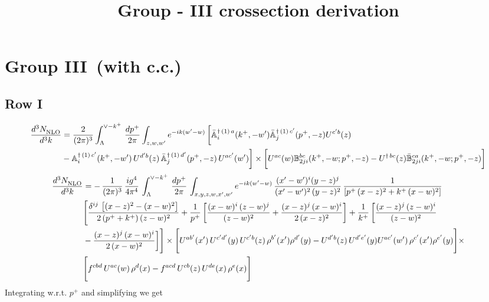 \documentclass[9pt]{article}
\title{Group - III crossection derivation}
\author{}
\date{}
\def\mf#1{\mathbb{#1}}
\numberwithin{equation}{section}
\begin{document}
\maketitle
\section{Group III\, (with c.c.)}
\subsection{Row I\, }
\begin{align}
 \frac{d^{3}N_{\rm NLO}^{\rm}}{d^{3}k}  & =    \frac{2}{(2\pi)^{3}} \int_{\Lambda}^{\vee - k^{+}}\, \frac{dp^{+}}{2\pi}\int_{z,w,w^{\prime}} e^{-ik(w^{\prime}-w)}\, 
        \bigg[\Bar{\mf{A}}^{\dagger\, (1)\, a}_{i}(k^{+},-w^{\prime})\Bar{\mf{A}}^{\dagger\, (1)\, c^{\prime}}_{j}(p^{+},-z)U^{c^{\prime}b}(z)\notag \\ & -\mf{A}^{\dagger\, (1)\, c^{\prime}}_{i}(k^{+},- w^{\prime})\,U^{d^{\prime}b}(z)\,\Bar{\mf{A}}^{\dagger\, (1)\, d^{\prime}}_{j}(p^{+},-z)\,U^{ac^{\prime}}(w^{\prime})  \bigg]\times \bigg[U^{ac}(w) \mf{B}^{bc}_{2ji}(k^{+},-w;p^{+},-z) -U^{\dagger\, bc}(z)\Bar{\mf{B}}^{ca}_{2ji}(k^{+},-w; p^{+},-z)\bigg] \nonumber
\end{align}
\begin{align}
    \frac{d^{3}N_{\rm NLO}^{\rm}}{d^{3}k}  & =  -\,\frac{1}{(2\pi)^{3}}\,\frac{ig^{4}}{4\pi^{4}}\, \int_{\Lambda}^{\vee-k^{+}}\, \frac{dp^{+}}{2\pi}\, \int_{x,y,z,w,x',w^{\prime}} e^{-ik(w^{\prime}-w)}\, \frac{(x'-w')^{i}(y-z)^{j}}{(x'-w')^{2}\,(y-z)^{2}}\, \frac{1}{\left[p^{+}\,(x-z)^{2}+k^{+}\,(x-w)^{2}\right]}\notag \\ & \Bigg[\frac{\delta^{ij}\, \left[(x-z)^{2}-(x-w)^{2}\right]}{2\, (p^{+}+k^{+})\,(z-w)^{2}}+\frac{1}{p^{+}}\, \bigg[\frac{(x-w)^{i}\,(z-w)^{j}}{(z-w)^{2}}+\frac{(x-z)^{j}\,(x-w)^{i}}{2\,(x-z)^{2}}\bigg]+\frac{1}{k^{+}}\,\bigg[\frac{(x-z)^{j}\,(z-w)^{i}}{(z-w)^{2}}\notag \\ & -\frac{(x-z)^{j}\,(x-w)^{i}}{2\,(x-w)^{2}}\bigg]\Bigg]\times \Bigg[U^{ab'}(x')\,U^{c'd'}(y)\,U^{c'b}(z)\,\rho^{b'}(x')\rho^{d'}(y)-U^{d'b}(z)\,U^{d'e'}(y)U^{ac'}(w')\,\rho^{c'}(x')\rho^{e'}(y)\Bigg]\times \notag \\ & \Bigg[f^{cbd}\,U^{ac}(w)\,\rho^{d}(x)-f^{acd}\, U^{cb}(z)\,U^{de}(x)\,\rho^{e}(x)\Bigg]
\end{align}
Integrating w.r.t. $p^{+}$ and simplifying we get
\end{document}
